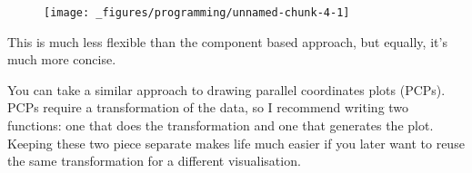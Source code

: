 \begin{Shaded}
\begin{Highlighting}[]
\StringTok{ }
\StringTok{    }\NormalTok{(} \NormalTok{) +}\StringTok{ }
\StringTok{    }\NormalTok{(} \NormalTok{) +}\StringTok{ }
\StringTok{    }\NormalTok{(}\NormalTok{) +}\StringTok{ }
\StringTok{    }\NormalTok{(}\NormalTok{)}
\NormalTok{\}}
\NormalTok{(}\NormalTok{(}\NormalTok{), } 
\end{Highlighting}
\end{Shaded}

\begin{figure}[H]
  \centering
  \texttt{[image: \_figures/programming/unnamed-chunk-4-1]}
\end{figure}

This is much less flexible than the component based approach, but
equally, it's much more concise.

You can take a similar approach to drawing parallel coordinates plots
(PCPs). PCPs require a transformation of the data, so I recommend
writing two functions: one that does the transformation and one that
generates the plot. Keeping these two piece separate makes life much
easier if you later want to reuse the same transformation for a
different visualisation. 

